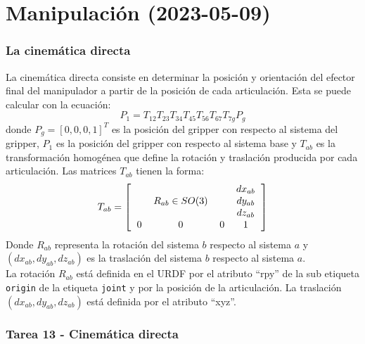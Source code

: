 \section{Manipulación (2023-05-09)}
\begin{frame}\frametitle{La cinemática directa}
  La cinemática directa consiste en determinar la posición y orientación del efector final del manipulador a partir de la posición de cada articulación.  Esta se puede calcular con la ecuación:
  \[P_1 = T_{12}T_{23}T_{34}T_{45}T_{56}T_{67}T_{7g}P_g\]
  donde $P_g = [0,0,0,1]^T$ es la posición del gripper con respecto al sistema del gripper, $P_1$ es la posición del gripper con respecto al sistema base y $T_{ab}$ es la transformación homogénea que define la rotación y traslación producida por cada articulación. Las matrices $T_{ab}$
  tienen la forma:
  \[T_{ab} = \left[\begin{tabular}{cccc}
      & & & $dx_{ab}$\\
      & $R_{ab}\in SO(3)$ & & $dy_{ab}$\\
      & & & $dz_{ab}$\\
      0 & 0& 0 & 1
    \end{tabular}\right]\]
  Donde $R_{ab}$ representa la rotación del sistema $b$ respecto al sistema $a$ y $(dx_{ab}, dy_{ab}, dz_{ab})$ es la traslación del sistema $b$ respecto al sistema $a$.\\
  La rotación $R_{ab}$ está definida en el URDF por el atributo ``rpy'' de la sub etiqueta \texttt{origin} de la etiqueta \texttt{joint} y por la posición de la articulación. La traslación $(dx_{ab}, dy_{ab}, dz_{ab})$ está definida por el atributo ``xyz''. 
\end{frame}

\begin{frame}\frametitle{Tarea 13 - Cinemática directa}
  
\end{frame}

